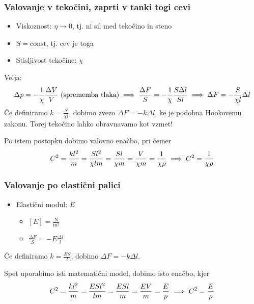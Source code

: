 \subsubsection*{Valovanje v tekočini, zaprti v tanki togi cevi}
\begin{itemize}
    \item Viskoznost: \(\eta \to 0\), tj. ni sil med tekočino in steno
    \item \(S = \text{const}\), tj. cev je toga
    \item Stisljivost tekočine: \(\chi \)  
\end{itemize}
%
Velja:
%
\[
\Delta p = - \frac{1}{\chi} \frac{\Delta V}{V} \ \text{(sprememba tlaka)} \implies \frac{\Delta F}{S} = - \frac{1}{\chi} \frac{S \Delta l}{S l} \implies \Delta F = - \frac{S}{\chi l} \Delta l
\]
%
Če definiramo \(k = \frac{S}{\chi l}\), dobimo zvezo \(\Delta F = -k \Delta l\), ke je podobna Hookovemu zakonu. Torej tekočino lahko obravnavamo kot vzmet!

Po istem postopku dobimo valovno enačbo, pri čemer
%
\[
C^2 = \frac{kl^2}{m} = \frac{Sl^2}{\chi l m} = \frac{Sl}{\chi m} = \frac{V}{\chi m} = \frac{1}{\chi \rho} \implies C^2 = \frac{1}{\chi \rho}
\]

\subsubsection*{Valovanje po elastični palici}
\begin{itemize}
    \item Elastični modul: \(E\)
    \begin{itemize}
        \item \([E] = \frac{\text{N}}{\text{m}^2}\)
        \item \(\frac{\Delta F}{S} = -E \frac{\Delta l}{l}\)
    \end{itemize}
\end{itemize}

Če definiramo \(k = \frac{ES}{l}\), dobimo \(\Delta F = -k \Delta l\).

Spet uporabimo isti matematični model, dobimo isto enačbo, kjer
\[
C^2 = \frac{kl^2}{m} = \frac{ESl^2}{lm} = \frac{ESl}{m} = \frac{EV}{m} = \frac{E}{\rho} \implies C^2 = \frac{E}{\rho}
\]